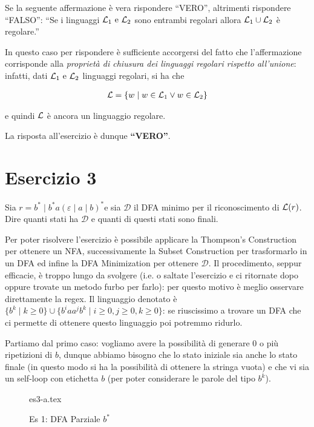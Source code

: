\documentclass[class=book, crop=false, oneside, 12pt]{standalone}
\begin{document}
Se la seguente affermazione è vera rispondere “VERO”, altrimenti rispondere “FALSO”: “Se i linguaggi \(\mathcal{L}_1 \textrm{ e } \mathcal{L}_2\) sono entrambi regolari allora \(\mathcal{L}_1 \cup \mathcal{L}_2\) è regolare.”

In questo caso per rispondere è sufficiente accorgersi del fatto che l'affermazione corrisponde alla \emph{proprietà di chiusura dei linguaggi regolari rispetto all'unione}: infatti, dati \(\mathcal{L}_1 \textrm{ e } \mathcal{L}_2\) linguaggi regolari, si ha che 

\begin{align*}
    \mathcal{L} = \{w \mid w \in \mathcal{L}_1 \lor w \in \mathcal{L}_2\}
\end{align*}

e quindi \(\mathcal{L}\) è ancora un linguaggio regolare. 

La risposta all'esercizio è dunque \textbf{“VERO”}.

\section*{Esercizio 3}

Sia \(r=b^* \mid b^* a (\varepsilon \mid a \mid b)^*\)e sia \(\mathcal{D}\) il DFA minimo per il riconoscimento di \(\mathcal{L}(r)\). Dire quanti stati ha \(\mathcal{D}\) e quanti di questi stati sono finali.

Per poter risolvere l'esercizio è possibile applicare la Thompson's Construction per ottenere un NFA, successivamente la Subset Construction per trasformarlo in un DFA ed infine la DFA Minimization per ottenere \(\mathcal{D}\). Il procedimento, seppur efficacie, è troppo lungo da svolgere (i.e. o saltate l'esercizio e ci ritornate dopo oppure trovate un metodo furbo per farlo): per questo motivo è meglio osservare direttamente la regex. Il linguaggio denotato è \(\{b^k \mid k \geq 0\} \cup \{b^i a a^j b^k \mid i \geq 0, j \geq 0, k \geq 0\}\): se riuscissimo a trovare un DFA che ci permette di ottenere questo linguaggio poi potremmo ridurlo. 

Partiamo dal primo caso: vogliamo avere la possibilità di generare 0 o più ripetizioni di \(b\), dunque abbiamo bisogno che lo stato iniziale sia anche lo stato finale (in questo modo si ha la possibilità di ottenere la stringa vuota) e che vi sia un self-loop con etichetta \(b\) (per poter considerare le parole del tipo \(b^k\)).

\begin{figure}[H]
	\centering
    {es3-a.tex}
    \caption{Es 1: DFA Parziale \(b^*\)}
    \label{fig:dfa-pt1-ex3}
\end{figure}
\end{document}
